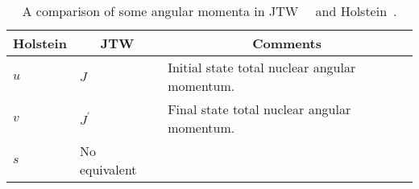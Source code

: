 %
%
%
\renewcommand{\arraystretch}{1.6}
\begin{table}[h!!!!t]
	\begin{center}
	\begin{tabular}{ | l | l | p{3.35in} | }
		\multicolumn{1}{c}{Holstein} 			& \multicolumn{1}{c}{JTW} 		& \multicolumn{1}{c}{Comments}
		\\  \hline
		$u$ 									& $J$							& Initial state total nuclear angular momentum.
		\\  \hline
		$v$ 									& $J^\prime$					& Final state total nuclear angular momentum.
		\\  \hline
		$s$										& No equivalent				& %
		\\  \hline
	\end{tabular}
	\end{center}
	\caption[Angular Momentum Notation]{A comparison of some angular momenta in JTW~\cite{jtw}~\cite{jtw_coulomb} and Holstein~\cite{holstein}\cite{holstein_errata}.}
	\label{table:compare_notation_angularmomentum}
\end{table}
\renewcommand{\arraystretch}{1}
%
%
